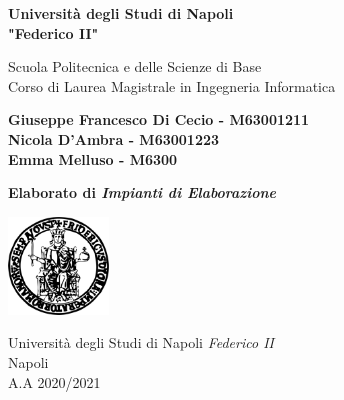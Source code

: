 \begin{titlepage}
	\begin{center}
		\vspace*{1cm}
		
		\Huge
		\textbf{Università degli Studi di Napoli \\ "Federico II"}
		
		\vspace{0.5cm}
		\LARGE
		Scuola Politecnica e delle Scienze di Base\\
		Corso di Laurea Magistrale in Ingegneria Informatica
		
		\vspace{1.5cm}
		
		\textbf{Giuseppe Francesco Di Cecio - M63001211}
		\\
		\textbf{Nicola D'Ambra - M63001223}
		\\
		\textbf{Emma Melluso - M6300}
		
		\vspace{2cm}
		
		
		
		\vspace{0.5cm}
		\LARGE
		\textbf{Elaborato di \textit{Impianti di Elaborazione}}
		\vfill
		
		\includegraphics[width=0.2\textwidth]{img/logo.png}
		
		\Large
		Università degli Studi di Napoli \textit{Federico II}\\
		Napoli\\
		A.A 2020/2021
		
	\end{center}
\end{titlepage}